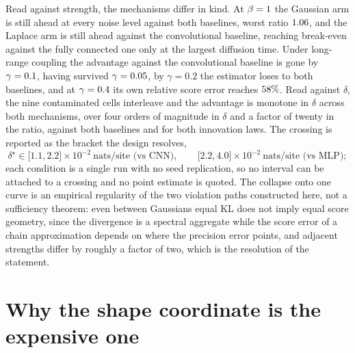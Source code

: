 Read against strength, the mechanisms differ in kind. At $\beta = 1$
the Gaussian arm is still ahead at every noise level against both baselines,
worst ratio $1.06$, and the Laplace arm is still ahead against the
convolutional baseline, reaching break-even against the fully connected one
only at the largest diffusion time. Under long-range coupling the advantage
against the convolutional baseline is gone by $\gamma = 0.1$, having
survived $\gamma = 0.05$, by $\gamma = 0.2$ the estimator loses to
both baselines, and at $\gamma = 0.4$ its own relative score error
reaches $58\%$. Read against $\delta$, the nine contaminated cells
interleave and the advantage is monotone in $\delta$ across both mechanisms,
over four orders of magnitude in $\delta$ and a factor of twenty in the
ratio, against both baselines and for both innovation laws. The crossing is
reported as the bracket the design resolves,
\begin{equation}
  \delta^{\star} \in \big[1.1, 2.2\big]\times 10^{-2}\ \text{nats/site (vs CNN)},
  \qquad
  \big[2.2, 4.0\big]\times 10^{-2}\ \text{nats/site (vs MLP)} ;
  \label{eq:em-breakeven}
\end{equation}
each condition is a single run with no seed replication, so no interval can
be attached to a crossing and no point estimate is quoted. The collapse onto
one curve is an empirical regularity of the two violation paths constructed
here, not a sufficiency theorem: even between Gaussians equal KL does not
imply equal score geometry, since the divergence is a spectral aggregate
while the score error of a chain approximation depends on where the
precision error points, and adjacent strengths differ by roughly a factor of
two, which is the resolution of the statement.

\section{Why the shape coordinate is the expensive one}
\label{sec:em-shape-information}

